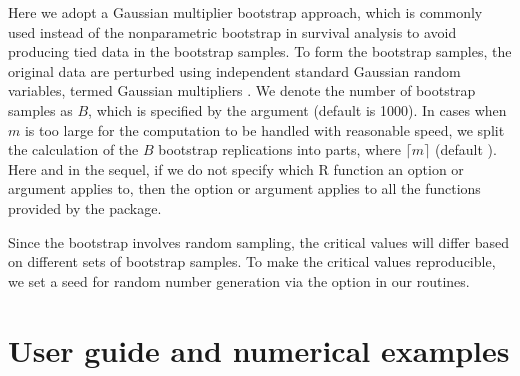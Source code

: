 Here we adopt a Gaussian multiplier bootstrap approach, which is commonly used instead of the nonparametric bootstrap in survival analysis %
to avoid producing tied data in the bootstrap samples.
To form the bootstrap samples, the original data are perturbed using independent standard Gaussian random variables, termed Gaussian multipliers \citep[see, e.g.,][]{P:1997}. 
We denote the number of bootstrap samples as $B$, which is specified by the  argument (default is 1000).
In cases when $m$ is too large for the computation
to be handled %
with reasonable speed,
we split the calculation of the $B$ bootstrap replications into  parts,
where $\lceil m$$\rceil$ (default ). %
Here and in the sequel, if we do not specify which R function an option or argument applies to, then the option or argument applies to all the functions provided by the  package. 



Since the bootstrap involves random sampling, the critical values will differ based on different sets of bootstrap samples. %
To make the critical values reproducible, we set a seed for random number generation  via the  option in our routines.

\section{User guide and numerical examples} \label{sec:user_guide}

